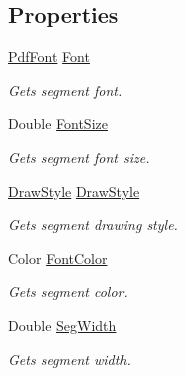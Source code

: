 \subsection*{Properties}
\begin{DoxyCompactItemize}
\item 
\hyperlink{class_pdf_file_writer_1_1_pdf_font}{Pdf\+Font} \hyperlink{class_pdf_file_writer_1_1_text_box_seg_a84d800defbedc85809b43aa5e61f5021}{Font}
\begin{DoxyCompactList}\small\item\em Gets segment font. \end{DoxyCompactList}\item 
Double \hyperlink{class_pdf_file_writer_1_1_text_box_seg_a3f47de35ffa9a9788e5c32ca18d2029a}{Font\+Size}
\begin{DoxyCompactList}\small\item\em Gets segment font size. \end{DoxyCompactList}\item 
\hyperlink{namespace_pdf_file_writer_a2bcdd73c6cedab15d6f6c2a64333ef39}{Draw\+Style} \hyperlink{class_pdf_file_writer_1_1_text_box_seg_ac71f2ff907fc05c43efadca22a5b9516}{Draw\+Style}
\begin{DoxyCompactList}\small\item\em Gets segment drawing style. \end{DoxyCompactList}\item 
Color \hyperlink{class_pdf_file_writer_1_1_text_box_seg_abfc443282401e8293c4046f0e89008cf}{Font\+Color}
\begin{DoxyCompactList}\small\item\em Gets segment color. \end{DoxyCompactList}\item 
Double \hyperlink{class_pdf_file_writer_1_1_text_box_seg_ac65ff2afd9aff489c89c5f14fc92e8a5}{Seg\+Width}
\begin{DoxyCompactList}\small\item\em Gets segment width. \end{DoxyCompactList}\item 

\end{DoxyCompactItemize}
